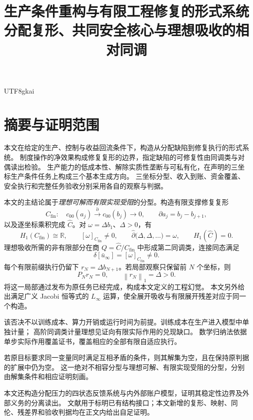 \documentclass[12pt,a4paper,openany]{report}
\numberwithin{equation}{chapter}
\newcommand{\RR}{\mathbb R}
\newcommand{\cfin}{C_{\mathrm{fin}}}
\newcommand{\chat}{\widehat C}
\newcommand{\Linfty}{L_\infty}
\newcommand{\Norm}[1]{\left\lVert#1\right\rVert}
\begin{document}
\begin{CJK*}{UTF8}{gkai}
\title{生产条件重构与有限工程修复的形式系统\\[0.6em]
\large 分配复形、共同安全核心与理想吸收的相对同调}
\author{}
\date{}
\hypersetup{pageanchor=false}
\maketitle
\setcounter{page}{2}
\hypersetup{pageanchor=true}

\chapter*{摘要与证明范围}

本文在给定的生产、控制与收益回流条件下，构造从分配缺陷到修复执行的形式系统。
制度操作的净效果构成修复复形的边界，指定缺陷的可修复性由同调类与对偶读出检验。
生产能力的低成本性、解除实质性垄断与可私有化，在声明的三坐标生产条件任务上构成三个基本生成方向。
三坐标分型、收入到账、资金覆盖、安全执行和完整任务验收分别采用各自的观察与判据。

本文的主结论属于\emph{理想可解而有限实现受阻}的分型。构造有限支撑修复复形
\[
 \cfin:\quad c_{00}(a_j)\xrightarrow{\partial}c_{00}(b_j)\longrightarrow0,
 \qquad \partial a_j=b_j-b_{j+1},
\]
以及逐坐标乘积完成 $\chat$。对 $\omega=\Delta b_1$、$\Delta>0$，有
\[
 H_1(\cfin)\cong\RR,\qquad [\omega]_{\cfin}\ne0,
 \qquad \widehat\partial\bigl(\Delta,\Delta,\ldots\bigr)=\omega,
 \qquad H_1(\chat)=0.
\]
理想吸收所需的非有限部分在商 $Q=\chat/\cfin$ 中形成第二同调类，连接同态满足
\[
 \boxed{\delta[\bar u_\infty]=[\omega]_{\cfin}\ne0.}
\]
每个有限前缀执行仍留下 $r_N=\Delta b_{N+1}$。若局部观察只保留前 $N$ 个坐标，则
\[
 \boxed{P_Nr_N=0,\qquad \Norm{r_N}_1=\Delta>0.}
\]
将这一局部通过发布为原任务已经完成，构成本文定义的工程幻觉。
本文另外给出满足广义 Jacobi 恒等式的 $\Linfty$ 运算，使全展开吸收与有限展开残差对应于同一个构造。

该否决不以训练成本、算力开销或运行时间为前提。训练成本在生产进入模型中单独计量；
高阶同调类计量理想见证向有限实际作用的兑现缺口。
数学归纳法依据单步实际作用覆盖证书，覆盖相应的全部有限自适应执行。

若原目标要求同一变量同时满足互相矛盾的条件，则其解集为空，且在保持原判据的扩展中仍为空。
这一绝对不相容分型与理想可解、有限实现受阻的分型，分别由解集条件和相应证明刻画。

本文还构造分配压力的四状态反馈系统与内外部账户模型，证明其稳定性边界及外部义务的分离读出。
文献用于标明已有结构接口；本文新增的复形、映射、同伦、残差界和验收判据均在正文内给出自足证明。


\end{CJK*}
\end{document}
